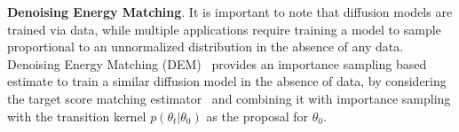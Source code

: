 \textbf{Denoising Energy Matching}. It is important to note that diffusion models are trained via data, while multiple applications require training a model to sample proportional to an unnormalized distribution in the absence of any data. Denoising Energy Matching (DEM)~\citep{akhound2024iterated} provides an importance sampling based estimate to train a similar diffusion model in the absence of data, by considering the target score matching estimator~\citep{de2024target} and combining it with importance sampling with the transition kernel $p(\theta_t | \theta_0)$ as the proposal for $\theta_0$.